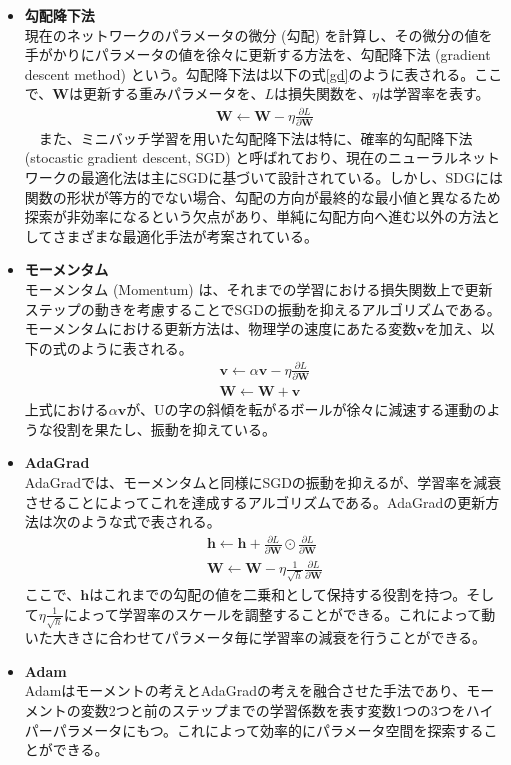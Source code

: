 \begin{itemize}
\item \textbf{勾配降下法}\\
現在のネットワークのパラメータの微分 (勾配) を計算し、その微分の値を手がかりにパラメータの値を徐々に更新する方法を、勾配降下法 (gradient descent method) という。勾配降下法は以下の式\ref{gd}のように表される。ここで、$\mathbf{W}$は更新する重みパラメータを、$L$は損失関数を、$\eta$は学習率を表す。
\begin{align}
 \label{gd}
 \mathbf{W} \leftarrow \mathbf{W} - \eta \frac{\partial L}{\partial \mathbf{W}}
\end{align}
　また、ミニバッチ学習を用いた勾配降下法は特に、確率的勾配降下法 (stocastic gradient descent, SGD) と呼ばれており、現在のニューラルネットワークの最適化法は主にSGDに基づいて設計されている。しかし、SDGには関数の形状が等方的でない場合、勾配の方向が最終的な最小値と異なるため探索が非効率になるという欠点があり、単純に勾配方向へ進む以外の方法としてさまざまな最適化手法が考案されている。
\item \textbf{モーメンタム}\\
モーメンタム (Momentum) は、それまでの学習における損失関数上で更新ステップの動きを考慮することでSGDの振動を抑えるアルゴリズムである。モーメンタムにおける更新方法は、物理学の速度にあたる変数$\mathbf{v}$を加え、以下の式のように表される。
\begin{align}
\mathbf{v} \leftarrow \alpha \mathbf{v} - \eta \frac{\partial L}{\partial \mathbf{W}}\\
\mathbf{W} \leftarrow \mathbf{W} + \mathbf{v}
\end{align}
上式における$\alpha \mathbf{v}$が、Uの字の斜傾を転がるボールが徐々に減速する運動のような役割を果たし、振動を抑えている。
\item \textbf{AdaGrad}\\
AdaGradでは、モーメンタムと同様にSGDの振動を抑えるが、学習率を減衰させることによってこれを達成するアルゴリズムである。AdaGradの更新方法は次のような式で表される。
\begin{align}
\mathbf{h} \leftarrow \mathbf{h} + \frac{\partial L}{\partial \mathbf{W}} \odot \frac{\partial L}{\partial \mathbf{W}} \\
\mathbf{W} \leftarrow \mathbf{W} - \eta \frac{1}{\sqrt{h}} \frac{\partial L}{\partial \mathbf{W}}
\end{align}
ここで、$\mathbf{h}$はこれまでの勾配の値を二乗和として保持する役割を持つ。そして$\eta \frac{1}{\sqrt{h}}$によって学習率のスケールを調整することができる。これによって動いた大きさに合わせてパラメータ毎に学習率の減衰を行うことができる。
\item \textbf{Adam}\\
Adamはモーメントの考えとAdaGradの考えを融合させた手法であり、モーメントの変数2つと前のステップまでの学習係数を表す変数1つの3つをハイパーパラメータにもつ。これによって効率的にパラメータ空間を探索することができる。
\end{itemize}
